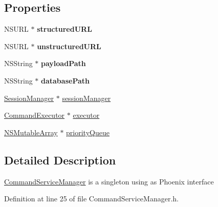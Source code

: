 \subsection*{Properties}
\begin{DoxyCompactItemize}
\item 
\hypertarget{interface_command_service_manager_ae247c3d2ff2e257ebf8b940c5ba9648a}{
NSURL $\ast$ {\bfseries structuredURL}}
\label{interface_command_service_manager_ae247c3d2ff2e257ebf8b940c5ba9648a}

\item 
\hypertarget{interface_command_service_manager_ab58cdedf7b8bb94f0e0fdd507624ec6e}{
NSURL $\ast$ {\bfseries unstructuredURL}}
\label{interface_command_service_manager_ab58cdedf7b8bb94f0e0fdd507624ec6e}

\item 
\hypertarget{interface_command_service_manager_ab8a317ec602402c3642cde5f76a3bf97}{
NSString $\ast$ {\bfseries payloadPath}}
\label{interface_command_service_manager_ab8a317ec602402c3642cde5f76a3bf97}

\item 
\hypertarget{interface_command_service_manager_a4bc10b66b56b688687e0b682605e3a8f}{
NSString $\ast$ {\bfseries databasePath}}
\label{interface_command_service_manager_a4bc10b66b56b688687e0b682605e3a8f}

\item 
\hyperlink{interface_session_manager}{SessionManager} $\ast$ \hyperlink{interface_command_service_manager_a50e3b4268a2a5cfe06921a3d4b342a12}{sessionManager}
\item 
\hyperlink{interface_command_executor}{CommandExecutor} $\ast$ \hyperlink{interface_command_service_manager_a952be87323bf86b13f564f4ae3c3f5b4}{executor}
\item 
\hyperlink{class_n_s_mutable_array}{NSMutableArray} $\ast$ \hyperlink{interface_command_service_manager_ac073942c39cc3cda8fb4bff35a39aa77}{priorityQueue}
\end{DoxyCompactItemize}


\subsection{Detailed Description}
\hyperlink{interface_command_service_manager}{CommandServiceManager} is a singleton using as Phoenix interface 

Definition at line 25 of file CommandServiceManager.h.



